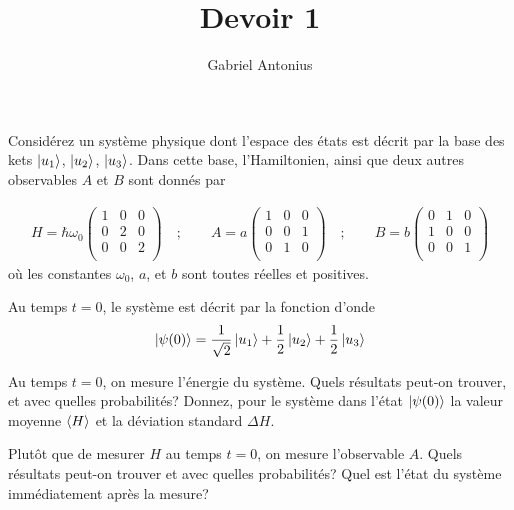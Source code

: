 \documentclass[12pt,solution=false]{uqtrassignment}
\title{Devoir 1}
\author{Gabriel Antonius}
\begin{document}
\maketitle

\begin{problem}{}

Considérez un système physique dont l'espace des états
  est décrit par la base des kets $\ket{u_1}$,  $\ket{u_2}$,  $\ket{u_3}$. 
Dans cette base, l'Hamiltonien, ainsi que deux autres observables $A$ et $B$
  sont donnés par


\begin{align*}
  H =
  \hbar \omega_0
  \begin{pmatrix}
     1 & 0 & 0 \\
     0 & 2 & 0 \\
     0 & 0 & 2 \\
  \end{pmatrix}
  \quad ; \qquad
  A =
  a
  \begin{pmatrix}
     1 & 0 & 0 \\
     0 & 0 & 1 \\
     0 & 1 & 0 \\
  \end{pmatrix}
  \quad ; \qquad
  B =
  b
  \begin{pmatrix}
     0 & 1 & 0 \\
     1 & 0 & 0 \\
     0 & 0 & 1 \\
  \end{pmatrix}
\end{align*}
où les constantes $\omega_0$, $a$, et $b$ sont toutes réelles et positives.

Au temps $t=0$, le système est décrit par la fonction d'onde
\begin{align}
  \ket{\psi(0)} = \frac{1}{\sqrt{2}} \ket{u_1}
                + \frac{1}{2} \ket{u_2}
                + \frac{1}{2} \ket{u_3}
\end{align}


\subproblem
Au temps $t=0$, on mesure l'énergie du système.
Quels résultats peut-on trouver, et avec quelles probabilités?
Donnez, pour le système dans l'état $\ket{\psi(0)}$
  la valeur moyenne $\braket{H}$
  et la déviation standard $\Delta H$.


\subproblem
Plutôt que de mesurer $H$ au temps $t=0$,
  on mesure l'observable $A$.
Quels résultats peut-on trouver et avec quelles probabilités?
Quel est l'état du système immédiatement après la mesure?


\end{problem}
\end{document}
